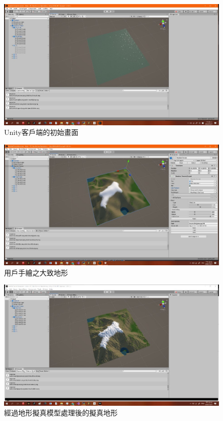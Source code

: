 \documentclass[a4paper, 12pt]{article}
\begin{document}
\begin{figure}[htbp]
    \centering
    \includegraphics[width=0.8\linewidth]{fig/14.jpg}
    \caption{Unity客戶端的初始畫面}
    \label{fig:14}
\end{figure}

\begin{figure}[htbp]
    \centering
    \includegraphics[width=0.8\linewidth]{fig/15.jpg}
    \caption{用戶手繪之大致地形}
    \label{fig:15}
\end{figure}

\begin{figure}[htbp]
    \centering
    \includegraphics[width=0.8\linewidth]{fig/16.jpg}
    \caption{經過地形擬真模型處理後的擬真地形}
    \label{fig:16}
\end{figure}
\end{document}

